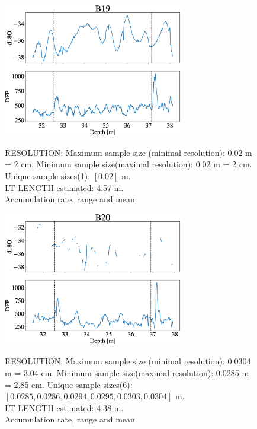 \documentclass[11pt]{article}
\begin{document}
\begin{figure}[h]
	\centering
	\includegraphics[width=0.7\textwidth]{Core_LT_B19.eps}
		\label{fig:B19}
	\caption{RESOLUTION: Maximum sample size (minimal resolution): 0.02 m = 2 cm. Minimum sample size(maximal resolution): 0.02 m = 2 cm. Unique sample sizes(1): $[0.02]$ m.\\
	LT LENGTH estimated: 4.57 m.\\
	Accumulation rate, range and mean.}
\end{figure}

\begin{figure}[h]
	\centering
	\includegraphics[width=0.7\textwidth]{Core_LT_B20.eps}
	\label{fig:B20}
	\caption{RESOLUTION: Maximum sample size (minimal resolution): 0.0304 m = 3.04 cm. Minimum sample size(maximal resolution): 0.0285 m = 2.85 cm. Unique sample sizes(6): $[0.0285, 0.0286, 0.0294, 0.0295, 0.0303, 0.0304]$ m.\\
	LT LENGTH estimated: 4.38 m.\\
	Accumulation rate, range and mean.}
	
\end{figure}
\end{document}
